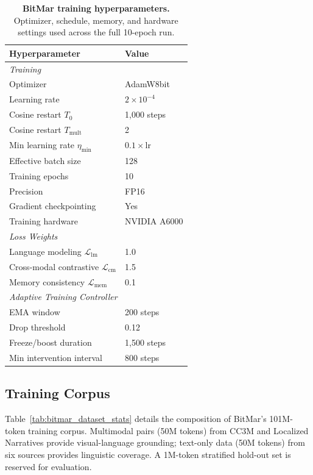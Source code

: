\begin{table}[htbp]
\centering
\caption{\textbf{BitMar training hyperparameters.} Optimizer, schedule, memory, and hardware settings used across the full 10-epoch run.}
\label{tab:bitmar_train_hyperparams}
\begin{tabular}{lp{5.5cm}}
\toprule
\textbf{Hyperparameter} & \textbf{Value} \\
\midrule
\multicolumn{2}{l}{\textit{Training}} \\
\quad Optimizer & AdamW8bit \\
\quad Learning rate & $2 \times 10^{-4}$ \\
\quad Cosine restart $T_0$ & 1{,}000 steps \\
\quad Cosine restart $T_{\text{mult}}$ & 2 \\
\quad Min learning rate $\eta_{\min}$ & $0.1 \times \text{lr}$ \\
\quad Effective batch size & 128 \\
\quad Training epochs & 10 \\
\quad Precision & FP16 \\
\quad Gradient checkpointing & Yes \\
\quad Training hardware & NVIDIA A6000 \\
\midrule
\multicolumn{2}{l}{\textit{Loss Weights}} \\
\quad Language modeling $\mathcal{L}_{\text{lm}}$ & 1.0 \\
\quad Cross-modal contrastive $\mathcal{L}_{\text{cm}}$ & 1.5 \\
\quad Memory consistency $\mathcal{L}_{\text{mem}}$ & 0.1 \\
\midrule
\multicolumn{2}{l}{\textit{Adaptive Training Controller}} \\
\quad EMA window & 200 steps \\
\quad Drop threshold & 0.12 \\
\quad Freeze/boost duration & 1{,}500 steps \\
\quad Min intervention interval & 800 steps \\
\bottomrule
\end{tabular}
\end{table}

\subsection{Training Corpus}

Table~\ref{tab:bitmar_dataset_stats} details the composition of BitMar's 101M-token training corpus. Multimodal pairs (50M tokens) from CC3M and Localized Narratives provide visual-language grounding; text-only data (50M tokens) from six sources provides linguistic coverage. A 1M-token stratified hold-out set is reserved for evaluation.

